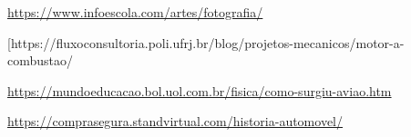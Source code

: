 \documentclass{report}
\begin{document}
\href{https://www.infoescola.com/artes/fotografia/}{https://www.infoescola.com/artes/fotografia/}

\href{https://fluxoconsultoria.poli.ufrj.br/blog/projetos-mecanicos/motor-a-combustao/}[{https://fluxoconsultoria.poli.ufrj.br/blog/projetos-mecanicos/motor-a-combustao/}

\href{https://mundoeducacao.bol.uol.com.br/fisica/como-surgiu-aviao.htm}{https://mundoeducacao.bol.uol.com.br/fisica/como-surgiu-aviao.htm}

\href{https://comprasegura.standvirtual.com/historia-automovel/}{https://comprasegura.standvirtual.com/historia-automovel/}
\end{document}
